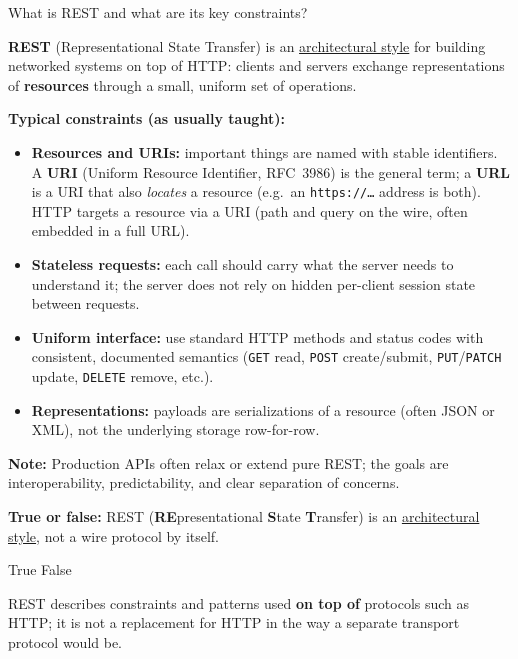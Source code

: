 \question[4]
What is REST and what are its key constraints?
\makeemptybox{1.00in}
\begin{solution}
  \textbf{REST} (Representational State Transfer) is an \uline{architectural style} for building networked systems on top of HTTP: clients and servers exchange representations of \textbf{resources} through a small, uniform set of operations.

  \noindent\textbf{Typical constraints (as usually taught):}
  \begin{itemize}
    \item \textbf{Resources and URIs:} important things are named with stable identifiers. A \textbf{URI} (Uniform Resource Identifier, RFC~3986) is the general term; a \textbf{URL} is a URI that also \emph{locates} a resource (e.g.\ an \texttt{https://\ldots} address is both). HTTP targets a resource via a URI (path and query on the wire, often embedded in a full URL).
    \item \textbf{Stateless requests:} each call should carry what the server needs to understand it; the server does not rely on hidden per-client session state between requests.
    \item \textbf{Uniform interface:} use standard HTTP methods and status codes with consistent, documented semantics (\texttt{GET} read, \texttt{POST} create/submit, \texttt{PUT}/\texttt{PATCH} update, \texttt{DELETE} remove, etc.).
    \item \textbf{Representations:} payloads are serializations of a resource (often JSON or XML), not the underlying storage row-for-row.
  \end{itemize}

  \noindent\textbf{Note:} Production APIs often relax or extend pure REST; the goals are interoperability, predictability, and clear separation of concerns.
\end{solution}

\question[4]
\textbf{True or false:} REST (\textbf{RE}presentational \textbf{S}tate \textbf{T}ransfer) is an \uline{architectural style}, not a wire protocol by itself.
\begin{choices}
  \CorrectChoice True
  \choice False
\end{choices}
\begin{solution}
  REST describes constraints and patterns used \textbf{on top of} protocols such as HTTP; it is not a replacement for HTTP in the way a separate transport protocol would be.
\end{solution}

